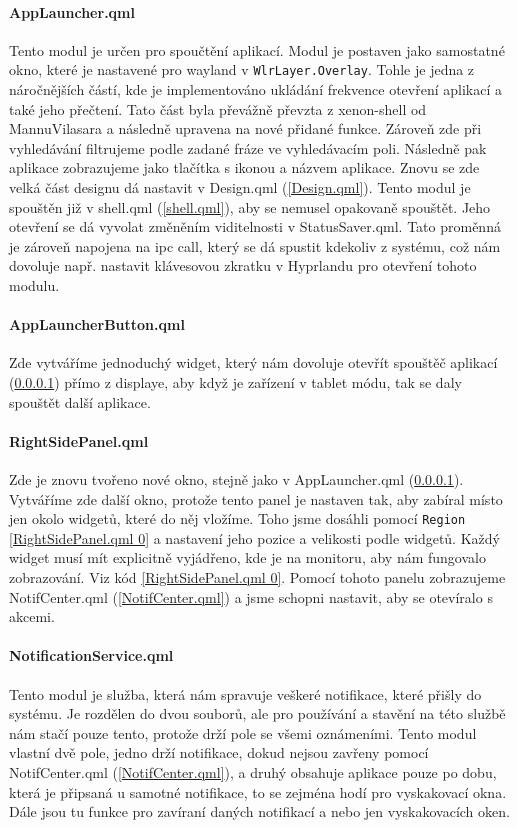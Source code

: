 \documentclass[12pt,a4paper]{article}
\begin{document}
\paragraph{AppLauncher.qml}
\label{AppLauncher.qml}
Tento modul je určen pro spoučtění aplikací. Modul je postaven jako samostatné okno, které je nastavené pro wayland v 
\verb|WlrLayer.Overlay|. Tohle je jedna z náročnějších částí, kde je implementováno ukládání frekvence otevření aplikací
a také jeho přečtení. Tato část byla převážně převzta z xenon-shell od MannuVilasara a následně upravena na nové přidané funkce.
\autocite{singhMannuVilasaraXenonshell2026} Zároveň zde při vyhledávání filtrujeme podle zadané fráze ve vyhledávacím poli.
Následně pak aplikace zobrazujeme jako tlačítka s ikonou a názvem aplikace. Znovu se zde velká část designu dá nastavit v 
Design.qml (\ref{Design.qml}). Tento modul je spouštěn již v shell.qml (\ref{shell.qml}), aby se nemusel opakovaně spouštět.
Jeho otevření se dá vyvolat změněním viditelnosti v StatusSaver.qml. Tato proměnná je zároveň napojena na ipc call, který
se dá spustit kdekoliv z systému, což nám dovoluje např. nastavit klávesovou zkratku v Hyprlandu pro otevření tohoto modulu.

\paragraph{AppLauncherButton.qml}
\label{AppLauncherButton.qml}
Zde vytváříme jednoduchý widget, který nám dovoluje otevřít spouštěč aplikací (\ref{AppLauncher.qml}) přímo z displaye, aby když je zařízení v 
tablet módu, tak se daly spouštět další aplikace.

\paragraph{RightSidePanel.qml}
\label{RightSidePanel.qml}
Zde je znovu tvořeno nové okno, stejně jako v  AppLauncher.qml (\ref{AppLauncher.qml}). Vytváříme zde další okno, protože tento
panel je nastaven tak, aby zabíral místo jen okolo widgetů, které do něj vložíme. Toho jsme dosáhli pomocí \verb|Region|
\ref{RightSidePanel.qml 0} a nastavení jeho pozice a velikosti podle widgetů. Každý widget musí mít explicitně vyjádřeno,
kde je na monitoru, aby nám fungovalo zobrazování. Viz kód \ref{RightSidePanel.qml 0}.
Pomocí tohoto panelu zobrazujeme NotifCenter.qml (\ref{NotifCenter.qml}) a jsme schopni nastavit, aby se otevíralo s akcemi.

\paragraph{NotificationService.qml}
\label{NotificationService.qml}
Tento modul je služba, která nám spravuje veškeré notifikace, které přišly do systému. Je rozdělen do dvou souborů, ale pro
používání a stavění na této službě nám stačí pouze tento, protože drží pole se všemi oznámeními. Tento modul vlastní dvě pole,
jedno drží notifikace, dokud nejsou zavřeny pomocí NotifCenter.qml (\ref{NotifCenter.qml}), a druhý obsahuje aplikace pouze po
dobu, která je připsaná u samotné notifikace, to se zejména hodí pro vyskakovací okna. Dále jsou tu funkce pro zavíraní daných
notifikací a nebo jen vyskakovacích oken.
\end{document}
